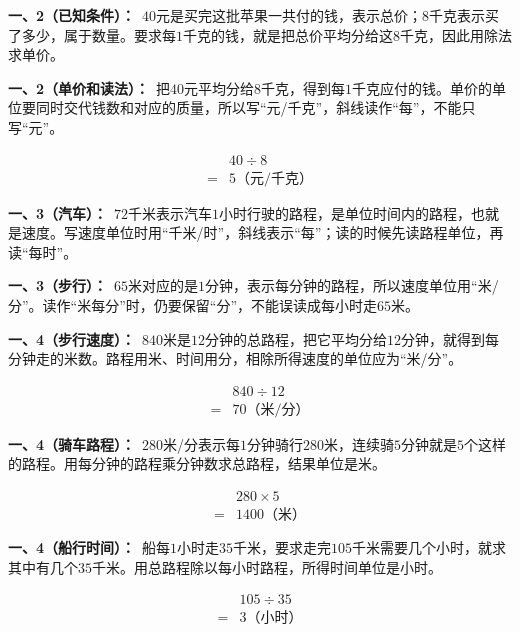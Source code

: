 \documentclass[multi=snippet,border=0pt]{standalone}
\newenvironment{snippet}[3]{\begin{minipage}{#1bp}\color{answerred}\fontsize{#2}{#3}\selectfont\raggedright}{\end{minipage}}
\begin{document}
\begin{snippet}{505}{11.5}{14}\textbf{一、2（已知条件）：}\ \(40\)元是买完这批苹果一共付的钱，表示总价；\(8\)千克表示买了多少，属于数量。要求每\(1\)千克的钱，就是把总价平均分给这\(8\)千克，因此用除法求单价。\end{snippet}
\begin{snippet}{505}{11.5}{14}\textbf{一、2（单价和读法）：}\ 把\(40\)元平均分给\(8\)千克，得到每\(1\)千克应付的钱。单价的单位要同时交代钱数和对应的质量，所以写“元/千克”，斜线读作“每”，不能只写“元”。\par \[\begin{aligned}&40\div8\\={}&5\text{（元/千克）}\end{aligned}\]\end{snippet}
\begin{snippet}{505}{11.5}{14}\textbf{一、3（汽车）：}\ \(72\)千米表示汽车\(1\)小时行驶的路程，是单位时间内的路程，也就是速度。写速度单位时用“千米/时”，斜线表示“每”；读的时候先读路程单位，再读“每时”。\end{snippet}
\begin{snippet}{505}{11.5}{14}\textbf{一、3（步行）：}\ \(65\)米对应的是\(1\)分钟，表示每分钟的路程，所以速度单位用“米/分”。读作“米每分”时，仍要保留“分”，不能误读成每小时走\(65\)米。\end{snippet}
\begin{snippet}{505}{11.5}{14}\textbf{一、4（步行速度）：}\ \(840\)米是\(12\)分钟的总路程，把它平均分给\(12\)分钟，就得到每分钟走的米数。路程用米、时间用分，相除所得速度的单位应为“米/分”。\par \[\begin{aligned}&840\div12\\={}&70\text{（米/分）}\end{aligned}\]\end{snippet}
\begin{snippet}{505}{11.5}{14}\textbf{一、4（骑车路程）：}\ \(280\)米/分表示每\(1\)分钟骑行\(280\)米，连续骑\(5\)分钟就是\(5\)个这样的路程。用每分钟的路程乘分钟数求总路程，结果单位是米。\par \[\begin{aligned}&280\times5\\={}&1400\text{（米）}\end{aligned}\]\end{snippet}
\begin{snippet}{505}{11.5}{14}\textbf{一、4（船行时间）：}\ 船每\(1\)小时走\(35\)千米，要求走完\(105\)千米需要几个小时，就求其中有几个\(35\)千米。用总路程除以每小时路程，所得时间单位是小时。\par \[\begin{aligned}&105\div35\\={}&3\text{（小时）}\end{aligned}\]\end{snippet}
\end{document}
